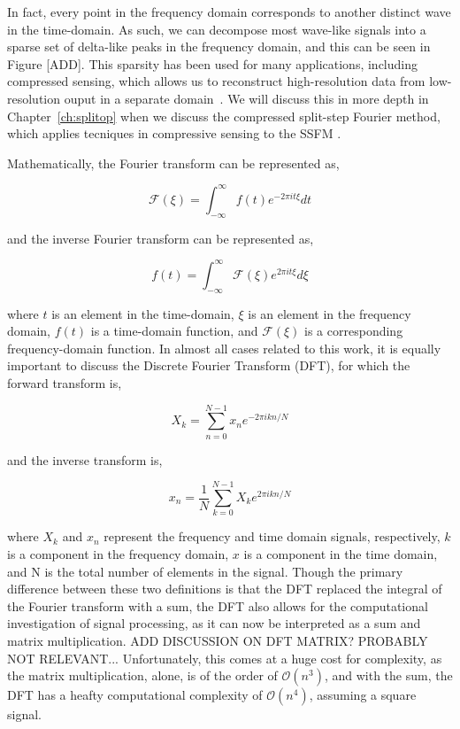 In fact, every point in the frequency domain corresponds to another distinct wave in the time-domain.
As such, we can decompose most wave-like signals into a sparse set of delta-like peaks in the frequency domain, and this can be seen in Figure [ADD].
This sparsity has been used for many applications, including compressed sensing, which allows us to reconstruct high-resolution data from low-resolution ouput in a separate domain~\cite{baraniuk2011}.
We will discuss this in more depth in Chapter~\ref{ch:splitop} when we discuss the compressed split-step Fourier method, which applies tecniques in compressive sensing to the SSFM \cite{bayindir2015}.

Mathematically, the Fourier transform can be represented as,

$$
\mathcal{F}(\xi) = \int_{-\infty}^{\infty}f(t)e^{-2\pi i t \xi}dt
$$

\noindent and the inverse Fourier transform can be represented as,

$$
f(t) = \int_{-\infty}^{\infty}\mathcal{F}(\xi)e^{2\pi i t \xi}d\xi
$$

\noindent where $t$ is an element in the time-domain, $\xi$ is an element in the frequency domain, $f(t)$ is a time-domain function, and $\mathcal{F}(\xi)$ is a corresponding frequency-domain function.
In almost all cases related to this work, it is equally important to discuss the Discrete Fourier Transform (DFT), for which the forward transform is,

$$
X_k = \sum_{n=0}^{N-1} x_n e^{-2 \pi i k n / N}
$$

\noindent and the inverse transform is,

$$
x_n = \frac{1}{N} \sum_{k=0}^{N-1} X_k e^{2 \pi i k n / N}
$$

\noindent where $X_k$ and $x_n$ represent the frequency and time domain signals, respectively, $k$ is a component in the frequency domain, $x$ is a component in the time domain, and N is the total number of elements in the signal.
Though the primary difference between these two definitions is that the DFT replaced the integral of the Fourier transform with a sum, the DFT also allows for the computational investigation of signal processing, as it can now be interpreted as a sum and matrix multiplication.
ADD DISCUSSION ON DFT MATRIX? PROBABLY NOT RELEVANT...
Unfortunately, this comes at a huge cost for complexity, as the matrix multiplication, alone, is of the order of $\mathcal{O}(n^3)$, and with the sum, the DFT has a heafty computational complexity of $\mathcal{O}(n^4)$, assuming a square signal.

